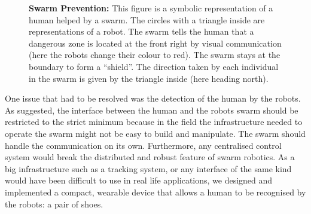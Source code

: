 \documentclass[oneside, a4paper, 12pt]{memoir}
\newcommand{\epuck}[3][0] %
{
	\draw [very thick, fill=white] (#2,#3) circle [radius=0.5];
	\draw [very thick, rotate around={#1:(#2,#3)}] (#2-0.25,#3-0.433) -- (#2,#3+0.45) -- (#2+0.25,#3-0.433);
}
\newcommand{\epuckred}[3][0] %
{
	\draw [very thick, fill=orange] (#2,#3) circle [radius=0.5];
	\draw [very thick, fill=orange, rotate around={#1:(#2,#3)}] (#2-0.25,#3-0.433) -- (#2,#3+0.45) -- (#2+0.25,#3-0.433);
}
\newcommand{\human}[3][0] %
{
	\draw [very thick, fill=white, rotate around={#1:(#2,#3)}] (#2-1,#3+0.5) ellipse (0.25cm and 0.5cm);
	\draw [very thick, fill=white, rotate around={#1:(#2,#3)}] (#2+1,#3+0.5) ellipse (0.25cm and 0.5cm);
	\draw [very thick, fill=white, rotate around={#1:(#2,#3)}] (#2,#3) ellipse (1.5cm and 0.75cm);
	\draw [thick, rotate around={#1:(#2,#3)}] (#2-0.05,#3+1) -- (#2,#3+1.1) -- (#2+0.05,#3+1);
	\draw [very thick, fill=white, rotate around={#1:(#2,#3)}] (#2,#3+0.5) circle [radius=0.5cm];
}
\let\oldCaption\caption
\renewcommand{\caption}[2]{
\oldCaption[#1]{{\small\sffamily\bfseries #1:} #2}
}
\begin{document}
	\begin{figure}\centering
		
		\caption{Swarm Prevention}{This figure is a symbolic representation of a human helped by a swarm. The circles with a triangle inside are representations of a robot. The swarm tells the human that a dangerous zone is located at the front right by visual communication (here the robots change their colour to red). The swarm stays at the boundary to form a \enquote{shield}. The direction taken by each individual in the swarm is given by the triangle inside (here heading north).}
		\label{fig:swarm_preventing}
	\end{figure}
	
	One issue that had to be resolved was the detection of the human by the robots. As \citet{podevijn2012self} suggested, the interface between the human and the robots swarm should be restricted to the strict minimum because in the field the infrastructure needed to operate the swarm might not be easy to build and manipulate. The swarm should handle the communication on its own. Furthermore, any centralised control system would break the distributed and robust feature of swarm robotics. As a big infrastructure such as a tracking system, or any interface of the same kind would have been difficult to use in real life applications, we designed and implemented a compact, wearable device that allows a human to be recognised by the robots: a pair of shoes.\\
	
\end{document}
